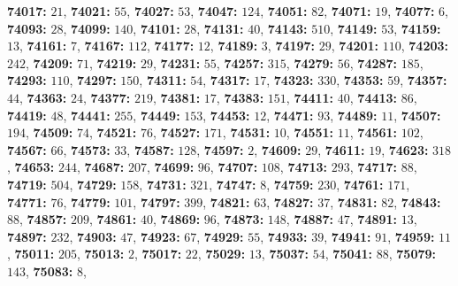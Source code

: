 \textsf{\bfseries 74017:} $21$, \textsf{\bfseries 74021:} $55$, \textsf{\bfseries 74027:} $53$, \textsf{\bfseries 74047:} $124$, \textsf{\bfseries 74051:} $82$, \textsf{\bfseries 74071:} $19$, \textsf{\bfseries 74077:} $6$, \textsf{\bfseries 74093:} $28$, \textsf{\bfseries 74099:} $140$, \textsf{\bfseries 74101:} $28$, \textsf{\bfseries 74131:} $40$, \textsf{\bfseries 74143:} $510$, \textsf{\bfseries 74149:} $53$, \textsf{\bfseries 74159:} $13$, \textsf{\bfseries 74161:} $7$, \textsf{\bfseries 74167:} $112$, \textsf{\bfseries 74177:} $12$, \textsf{\bfseries 74189:} $3$, \textsf{\bfseries 74197:} $29$, \textsf{\bfseries 74201:} $110$, \textsf{\bfseries 74203:} $242$, \textsf{\bfseries 74209:} $71$, \textsf{\bfseries 74219:} $29$, \textsf{\bfseries 74231:} $55$, \textsf{\bfseries 74257:} $315$, \textsf{\bfseries 74279:} $56$, \textsf{\bfseries 74287:} $185$, \textsf{\bfseries 74293:} $110$, \textsf{\bfseries 74297:} $150$, \textsf{\bfseries 74311:} $54$, \textsf{\bfseries 74317:} $17$, \textsf{\bfseries 74323:} $330$, \textsf{\bfseries 74353:} $59$, \textsf{\bfseries 74357:} $44$, \textsf{\bfseries 74363:} $24$, \textsf{\bfseries 74377:} $219$, \textsf{\bfseries 74381:} $17$, \textsf{\bfseries 74383:} $151$, \textsf{\bfseries 74411:} $40$, \textsf{\bfseries 74413:} $86$, \textsf{\bfseries 74419:} $48$, \textsf{\bfseries 74441:} $255$, \textsf{\bfseries 74449:} $153$, \textsf{\bfseries 74453:} $12$, \textsf{\bfseries 74471:} $93$, \textsf{\bfseries 74489:} $11$, \textsf{\bfseries 74507:} $194$, \textsf{\bfseries 74509:} $74$, \textsf{\bfseries 74521:} $76$, \textsf{\bfseries 74527:} $171$, \textsf{\bfseries 74531:} $10$, \textsf{\bfseries 74551:} $11$, \textsf{\bfseries 74561:} $102$, \textsf{\bfseries 74567:} $66$, \textsf{\bfseries 74573:} $33$, \textsf{\bfseries 74587:} $128$, \textsf{\bfseries 74597:} $2$, \textsf{\bfseries 74609:} $29$, \textsf{\bfseries 74611:} $19$, \textsf{\bfseries 74623:} $318$, \textsf{\bfseries 74653:} $244$, \textsf{\bfseries 74687:} $207$, \textsf{\bfseries 74699:} $96$, \textsf{\bfseries 74707:} $108$, \textsf{\bfseries 74713:} $293$, \textsf{\bfseries 74717:} $88$, \textsf{\bfseries 74719:} $504$, \textsf{\bfseries 74729:} $158$, \textsf{\bfseries 74731:} $321$, \textsf{\bfseries 74747:} $8$, \textsf{\bfseries 74759:} $230$, \textsf{\bfseries 74761:} $171$, \textsf{\bfseries 74771:} $76$, \textsf{\bfseries 74779:} $101$, \textsf{\bfseries 74797:} $399$, \textsf{\bfseries 74821:} $63$, \textsf{\bfseries 74827:} $37$, \textsf{\bfseries 74831:} $82$, \textsf{\bfseries 74843:} $88$, \textsf{\bfseries 74857:} $209$, \textsf{\bfseries 74861:} $40$, \textsf{\bfseries 74869:} $96$, \textsf{\bfseries 74873:} $148$, \textsf{\bfseries 74887:} $47$, \textsf{\bfseries 74891:} $13$, \textsf{\bfseries 74897:} $232$, \textsf{\bfseries 74903:} $47$, \textsf{\bfseries 74923:} $67$, \textsf{\bfseries 74929:} $55$, \textsf{\bfseries 74933:} $39$, \textsf{\bfseries 74941:} $91$, \textsf{\bfseries 74959:} $11$, \textsf{\bfseries 75011:} $205$, \textsf{\bfseries 75013:} $2$, \textsf{\bfseries 75017:} $22$, \textsf{\bfseries 75029:} $13$, \textsf{\bfseries 75037:} $54$, \textsf{\bfseries 75041:} $88$, \textsf{\bfseries 75079:} $143$, \textsf{\bfseries 75083:} $8$, 
